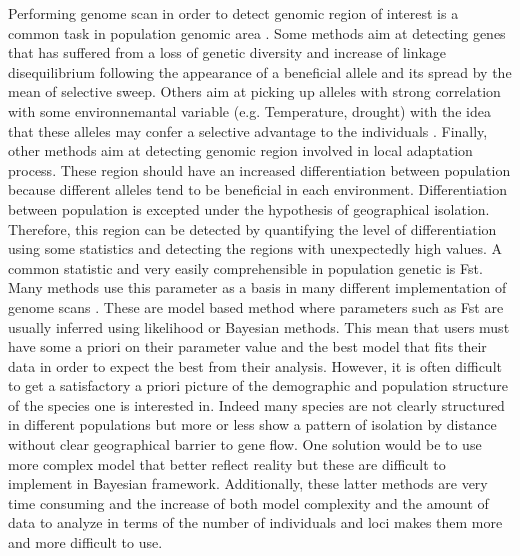 \documentclass[nogrid]{MBE}%
\begin{document}
Performing genome scan in order to detect genomic region of interest is a common task in population genomic area \citep{Foll2008,Frichot2013,Luu2016,Vatsiou2015}. Some methods aim at detecting  genes that has suffered from a loss of genetic diversity and increase of linkage disequilibrium following the appearance of a beneficial allele and its spread by the mean of selective sweep. Others aim at picking up alleles with strong correlation with some environnemantal variable (e.g. Temperature, drought) with the idea that these alleles may confer a selective advantage to the individuals  \citep{Coop2010,Frichot2013}. Finally, other methods aim at detecting genomic region involved in local adaptation process. These region should have an increased differentiation between population because different alleles tend to be beneficial in each environment. Differentiation between population is excepted under the hypothesis of geographical isolation. Therefore, this region can be detected by quantifying the level of differentiation using some statistics and detecting the regions with unexpectedly high values. A common statistic and very easily comprehensible in population genetic is Fst. Many methods use this parameter as a basis in many different implementation of genome scans \citep{Bazin2010,DeVillemereuil2015,Foll2008}. These are model based method where parameters such as Fst are usually inferred using likelihood or Bayesian methods. This mean that users must have some a priori on their parameter value and the best model that fits their data in order to expect the best from their analysis.
	However, it is often difficult to get a satisfactory a priori picture of the demographic and population structure of the species one is interested in. Indeed many species are not clearly structured in different populations but more or less show a pattern of isolation by distance without clear geographical barrier to gene flow. One solution would be to use more complex model that better reflect reality but these are difficult to implement in Bayesian framework. Additionally, these latter methods are very time consuming and the increase of both model complexity and the amount of data to analyze in terms of the number of individuals and loci makes them more and more difficult to use.
\end{document}
